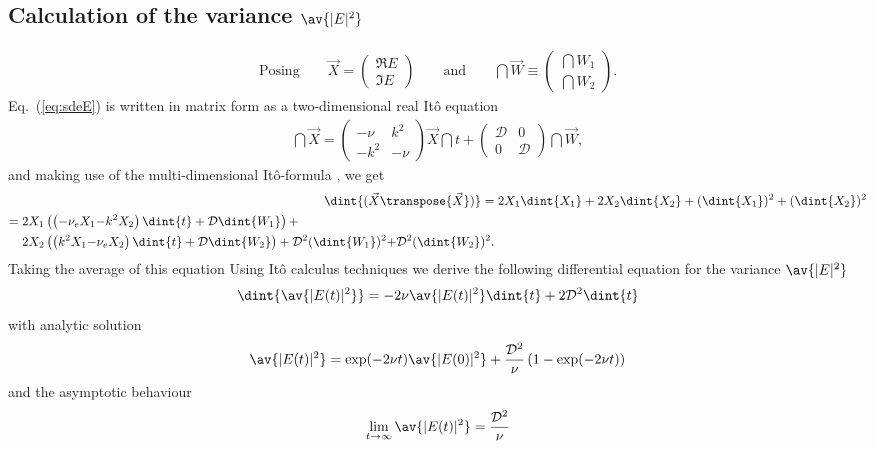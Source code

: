 \documentclass[10pt,a4paper]{article}
\newcommand{\eq}[1]{Eq.~(\ref{#1})}
\newcommand{\src}{\ensuremath{\mathcal{D}}}
\begin{document}
\subsection{Calculation of the variance $\av{|E|^2}$}
\begin{align}
\text{Posing}\qquad\vec{X}=\begin{pmatrix}\Re{E}\\\Im{E}\end{pmatrix}
\qquad\text{and}\qquad
\dint{\vec{W}}\equiv
\begin{pmatrix}\dint{W_1}\\\dint{W_2}\end{pmatrix}.
\end{align}
\eq{eq:sdeE} is written in matrix form as a two-dimensional real It\^o equation
\begin{align}
\dint{\vec{X}}=
\begin{pmatrix}{-}\nu&k^2\\{-}k^2&{-}\nu\end{pmatrix}\vec{X}\dint{t}+
\begin{pmatrix}\src&0\\0&\src\end{pmatrix}\dint{\vec{W}},
\end{align}
and making use of the multi-dimensional It\^o-formula \citep{oksendal:2000},
we get
\begin{align}
\dint{(\vec{X}\transpose{\vec{X}})} = & \;
2X_1\dint{X_1}+2X_2\dint{X_2}+(\dint{X_1})^2+(\dint{X_2})^2\\
\begin{split}
=&\; 2X_1\left(\left(-\nu_eX_1{-}k^2X_2\right)\dint{t}+
\src\dint{W_1}\right)+\\
&\; 2X_2\left(\left(k^2X_1{-}\nu_eX_2\right)\dint{t}+
\src\dint{W_2}\right)+
\src^2(\dint{W_1})^2{+}\src^2(\dint{W_2})^2.
\end{split}
\end{align}
Taking the average of this equation
Using Itô calculus techniques \citep{farrell:1996}
we derive the following differential equation
for the variance $\av{|E|^2}$
\begin{align}
\dint{\av{|E(t)|^2}} = -2\nu\av{|E(t)|^2}\dint{t}+2\src^2\dint{t}
\end{align}
with analytic solution
\begin{align}
\av{|E(t)|^2} = \exp(-2\nu t)\av{|E(0)|^2} + \frac{\src^2}{\nu}\left(1-\exp(-2\nu t)\right)
\label{eq:sde0a}
\end{align}
and the asymptotic behaviour
\begin{align}
\lim_{t\rightarrow\infty}\av{|E(t)|^2} = \frac{\src^2}{\nu}
\end{align}
\end{document}
